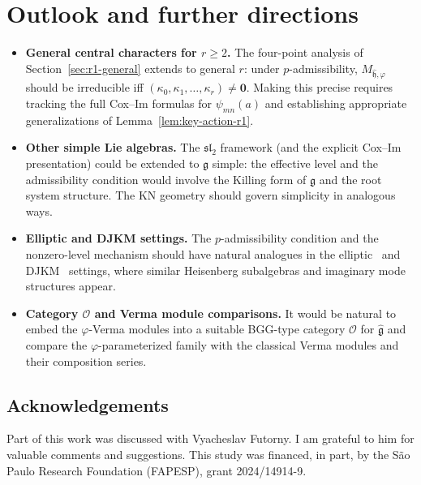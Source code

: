 \documentclass{amsart}
\newcommand{\g}{\mathfrak{g}}
\newcommand{\h}{\mathfrak{h}}
\newcommand{\sltwo}{\mathfrak{sl}_2}
\newcommand{\wh}[1]{\widehat{#1}}
\newcommand{\whg}{\wh{\g}}
\newcommand{\whh}{\wh{\h}}
\theoremstyle{definition}
\theoremstyle{remark}
\numberwithin{equation}{section}
\begin{document}
\section{Outlook and further directions}\label{sec:outlook}
\begin{itemize}[leftmargin=2em]
\item \textbf{General central characters for $r\ge2$.}
The four-point analysis of Section~\ref{sec:r1-general} extends to
general $r$: under $p$-admissibility, $M_{\whh,\varphi}$ should be
irreducible iff $(\kappa_0,\kappa_1,\dots,\kappa_r)\neq\mathbf{0}$.
Making this precise requires tracking the full Cox--Im formulas for
$\psi_{mn}(a)$ and establishing appropriate generalizations of
Lemma~\ref{lem:key-action-r1}.
\item \textbf{Other simple Lie algebras.}
The $\sltwo$ framework (and the explicit Cox--Im presentation) could be
extended to $\g$ simple: the effective level and the admissibility
condition would involve the Killing form of $\g$ and the root system
structure.  The KN geometry should govern simplicity in analogous ways.
\item \textbf{Elliptic and DJKM settings.}
The $p$-admissibility condition and the nonzero-level mechanism should
have natural analogues in the elliptic~\cite{Bueno:2009aa} and
DJKM~\cite{date1983landau,Cox:2013ab,cox2013djkm} settings, where similar Heisenberg
subalgebras and imaginary mode structures appear.
\item \textbf{Category $\mathcal{O}$ and Verma module comparisons.}
It would be natural to embed the $\varphi$-Verma modules into a suitable
BGG-type category $\mathcal{O}$ for $\whg$ and compare the
$\varphi$-parameterized family with the classical Verma modules and
their composition series.
\end{itemize}
\subsection*{Acknowledgements}
Part of this work was discussed with Vyacheslav Futorny. I am grateful to
him for valuable comments and suggestions.  This study was financed, in
part, by the S\~ao Paulo Research Foundation (FAPESP), grant 2024/14914-9.
\end{document}
